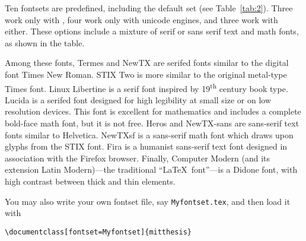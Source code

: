 \documentclass[11pt]{article}
\newcommand*\pdfTeX{\hologo{pdfTeX}}
\begin{document}
Ten fontsets are predefined, including the default set (see Table~\ref{tab:2}).  Three work only with \pdfTeX, four work only with unicode engines, and three work with either.  These options include a mixture of serif or sans serif text and math fonts, as shown in the table.

Among these fonts, Termes and NewTX are serifed fonts similar to the digital font Times New Roman.  STIX Two is more similar to the original metal-type Times font. Linux Libertine is a serif font inspired by 19\textsuperscript{th} century book type. Lucida is a serifed font designed for high legibility at small size or on low resolution devices. This font is excellent for mathematics and includes a complete bold-face math font, but it is not free. Heros and NewTX-sans are sans-serif text fonts similar to Helvetica. NewTXsf is a sans-serif math font which draws upon glyphs from the STIX font. Fira is a humanist sans-serif text font designed in association with the Firefox browser. Finally, Computer Modern (and its extension Latin Modern)---the traditional ``\LaTeX\ font''---is a Didone font, with high contrast between thick and thin elements.

You may also write your own fontset file, say \texttt{Myfontset.tex}, and then load it with

\vskip10pt
\hfill\verb|\documentclass[fontset=Myfontset]{mitthesis}|\hfill\hbox{}
\end{document}

